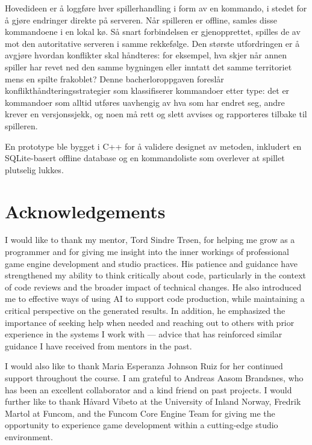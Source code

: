\documentclass{article}
\begin{document}
Hovedideen er å loggføre hver spillerhandling i form av en kommando, i stedet for å gjøre endringer direkte på serveren. Når spilleren er offline, samles disse kommandoene i en lokal kø. Så snart forbindelsen er gjenopprettet, spilles de av mot den autoritative serveren i samme rekkefølge. Den største utfordringen er å avgjøre hvordan konflikter skal håndteres: for eksempel, hva skjer når annen spiller har revet ned den samme bygningen eller inntatt det samme territoriet mens en spilte frakoblet? Denne bacherloroppgaven foreslår konflikthåndteringsstrategier som klassifiserer kommandoer etter type: det er kommandoer som alltid utføres uavhengig av hva som har endret seg, andre krever en versjonssjekk, og noen må rett og slett avvises og rapporteres tilbake til spilleren.

En prototype ble bygget i C++ for å validere designet av metoden, inkludert en SQLite-basert offline database og en kommandoliste som overlever at spillet plutselig lukkes. 
\newpage

\section*{Acknowledgements}

I would like to thank my mentor, Tord Sindre Trøen, for helping me grow as a programmer and for giving me insight into the inner workings of professional game engine development and studio practices. His patience and guidance have strengthened my ability to think critically about code, particularly in the context of code reviews and the broader impact of technical changes. He also introduced me to effective ways of using AI to support code production, while maintaining a critical perspective on the generated results. In addition, he emphasized the importance of seeking help when needed and reaching out to others with prior experience in the systems I work with — advice that has reinforced similar guidance I have received from mentors in the past.

I would also like to thank Maria Esperanza Johnson Ruiz for her continued support throughout the course. I am grateful to Andreas Aasom Brandsnes, who has been an excellent collaborator and a kind friend on past projects. I would further like to thank Håvard Vibeto at the University of Inland Norway, Fredrik Martol at Funcom, and the Funcom Core Engine Team for giving me the opportunity to experience game development within a cutting-edge studio environment.
\end{document}
